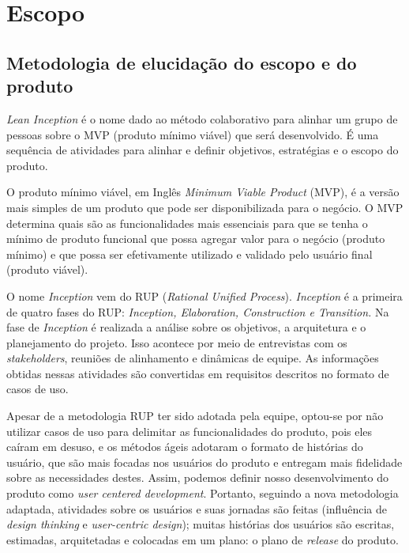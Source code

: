 \chapter{Escopo}
\label{escopo}

\section{Metodologia de elucidação do escopo e do produto}

\par \textit{Lean Inception} é o nome dado ao método colaborativo para alinhar um grupo de pessoas sobre o MVP (produto mínimo viável) que será desenvolvido. É uma sequência de atividades para alinhar e definir objetivos, estratégias e o escopo do produto.\cite{caroli2014lean} 
\par O produto mínimo viável, em Inglês\textit{  Minimum Viable Product} (MVP), é a versão mais simples de um produto que pode ser disponibilizada para o negócio. O MVP determina quais são as funcionalidades mais essenciais para que se tenha o mínimo de produto funcional que possa agregar valor para o negócio (produto mínimo) e que possa ser efetivamente utilizado e validado pelo usuário final (produto viável). \cite{moogk2012minimum}
\par O nome\textit{ Inception }vem do RUP (\textit{Rational Unified Process}). \textit{Inception} é a primeira de quatro fases do RUP: \textit{Inception, Elaboration, Construction e Transition.} Na fase de \textit{Inception} é realizada a análise sobre os objetivos, a arquitetura e o planejamento do projeto. Isso acontece por meio de entrevistas com os \textit{stakeholders}, reuniões de alinhamento e dinâmicas de equipe. As informações obtidas nessas atividades são convertidas em requisitos descritos no formato de casos de uso. \cite{caroli2014lean} 
\par Apesar de a metodologia RUP ter sido adotada pela equipe, optou-se por não utilizar  casos de uso para delimitar as funcionalidades do produto, pois eles caíram em desuso, e os métodos ágeis adotaram o formato de histórias do usuário, que são mais focadas nos usuários do produto e entregam mais fidelidade sobre as necessidades destes. Assim, podemos definir nosso desenvolvimento do produto como \textit{user centered development}. Portanto, seguindo a nova metodologia adaptada, atividades sobre os usuários e suas jornadas são feitas (influência de \textit{design thinking} e \textit{user-centric design}); muitas histórias dos usuários são escritas, estimadas, arquitetadas e colocadas em um plano: o plano de \textit{release} do produto. 
